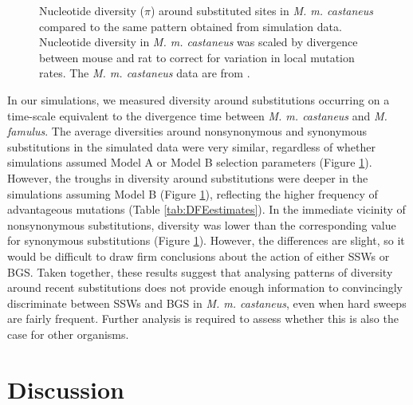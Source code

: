  \begin{figure}[H]
   \centering      
   \noindent{}
 \caption[Reductions in nucleotide diversity around recent substitutions in \textit{M. m. castaneus} and simulated populations]{Nucleotide diversity ($\pi$) around substituted sites in \textit{M. m. castaneus} compared to the same pattern obtained from simulation data. Nucleotide diversity in \textit{M. m. castaneus} was scaled by divergence between mouse and rat to correct for variation in local mutation rates. The \textit{M. m. castaneus} data are from \cite{RN122}. }
 \label{fig:SattathPlot}
\end{figure}


	In our simulations, we measured diversity around substitutions occurring on a time-scale equivalent to the divergence time between \textit{M. m. castaneus} and \textit{M. famulus}. The average diversities around nonsynonymous and synonymous substitutions in the simulated data were very similar, regardless of whether simulations assumed Model A or Model B selection parameters (Figure \ref{fig:SattathPlot}). However, the troughs in diversity around substitutions were deeper in the simulations assuming Model B (Figure \ref{fig:SattathPlot}), reflecting the higher frequency of advantageous mutations (Table \ref{tab:DFEestimates}). In the immediate vicinity of nonsynonymous substitutions, diversity was lower than the corresponding value for synonymous substitutions (Figure \ref{fig:SattathPlot}). However, the differences are slight, so it would be difficult to draw firm conclusions about the action of either SSWs or BGS. Taken together, these results suggest that analysing patterns of diversity around recent substitutions does not provide enough information to convincingly discriminate between SSWs and BGS in \textit{M. m. castaneus}, even when hard sweeps are fairly frequent. Further analysis is required to assess whether this is also the case for other organisms.

\linespread{1}

\linespread{2}

\section{Discussion}

